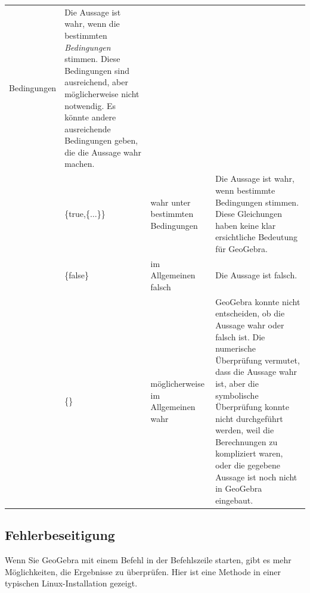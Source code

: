 \documentclass{article}
\begin{document}
\begin{tabular}{|>{\raggedright}m{}|>{\centering}m{}|>{\centering}m{}|>{\centering}m{}|}
{Bedingungen} & {\footnotesize{}Die Aussage ist wahr, wenn die bestimmten }\emph{\footnotesize{}Bedingungen}{\footnotesize{}
stimmen. Diese Bedingungen sind ausreichend, aber möglicherweise nicht notwendig. Es 
könnte andere ausreichende Bedingungen geben, die die Aussage wahr machen.}\tabularnewline
\cline{2-4} 
 & {\footnotesize{}\{true,\{$\ldots$\}\}} & {\footnotesize{}wahr unter bestimmten Bedingungen} & {\footnotesize{} Die Aussage ist wahr, wenn bestimmte Bedingungen stimmen.
Diese Gleichungen haben keine klar ersichtliche Bedeutung für GeoGebra.}\tabularnewline
\cline{2-4} 
 & {\footnotesize{}\{false\}} & {\footnotesize{}im Allgemeinen falsch} & {\footnotesize{} Die Aussage ist falsch.}\tabularnewline
\cline{2-4} 
 & {\footnotesize{}\{\}} & {\footnotesize{} möglicherweise im Allgemeinen wahr} & {\footnotesize{}GeoGebra konnte nicht entscheiden, ob die Aussage wahr oder falsch ist.
Die numerische Überprüfung vermutet, dass die Aussage wahr ist, aber die symbolische
Überprüfung konnte nicht durchgeführt werden, weil die Berechnungen zu kompliziert waren, oder die gegebene Aussage ist noch nicht in GeoGebra eingebaut.}\tabularnewline
\hline 
\end{tabular}


\subsection{Fehlerbeseitigung}
Wenn Sie GeoGebra mit einem Befehl in der Befehlszeile starten, gibt es mehr Möglichkeiten, die Ergebnisse zu überprüfen. Hier ist eine Methode in einer typischen Linux-Installation gezeigt.
\end{document}
